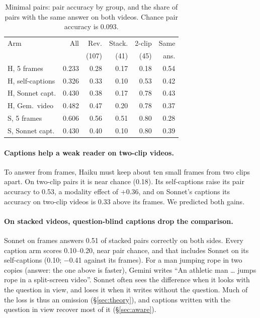 \documentclass[11pt]{article}
\begin{document}
\begin{table}[t]
\centering
\footnotesize
\setlength{\tabcolsep}{3pt}
\begin{tabular}{@{}lrrrrr@{}}
\toprule
Arm & All & Rev. & Stack. & 2-clip & Same \\
 & & (107) & (41) & (45) & ans. \\
\midrule
H, 5 frames & 0.233 & 0.28 & 0.17 & 0.18 & 0.54 \\
H, self-captions & 0.326 & 0.33 & 0.10 & 0.53 & 0.42 \\
H, Sonnet capt. & 0.430 & 0.38 & 0.17 & 0.78 & 0.43 \\
H, Gem.\ video & 0.482 & 0.47 & 0.20 & 0.78 & 0.37 \\
S, 5 frames & 0.606 & 0.56 & 0.51 & 0.80 & 0.28 \\
S, Sonnet capt. & 0.430 & 0.40 & 0.10 & 0.80 & 0.39 \\
\bottomrule
\end{tabular}
\caption{Minimal pairs: pair accuracy by group, and the share of pairs with the same answer on both videos. Chance pair accuracy is 0.093.}
\label{tab:pairs}
\end{table}

\paragraph{Captions help a weak reader on two-clip videos.} To answer from frames, Haiku must keep about ten small frames from two clips apart. On two-clip pairs it is near chance (0.18). Its self-captions raise its pair accuracy to 0.53, a modality effect of +0.36, and on Sonnet's captions its accuracy on two-clip videos is 0.33 above its frames. We predicted both gains.

\paragraph{On stacked videos, question-blind captions drop the comparison.} Sonnet on frames answers 0.51 of stacked pairs correctly on both sides. Every caption arm scores 0.10--0.20, near pair chance, and that includes Sonnet on its self-captions (0.10; −0.41 against its frames). For a man jumping rope in two copies (answer: the one above is faster), Gemini writes ``An athletic man \ldots{} jumps rope in a split-screen video''. Sonnet often sees the difference when it looks with the question in view, and loses it when it writes without the question. Much of the loss is thus an omission (\S\ref{sec:theory}), and captions written with the question in view recover most of it (\S\ref{sec:aware}).
\end{document}
